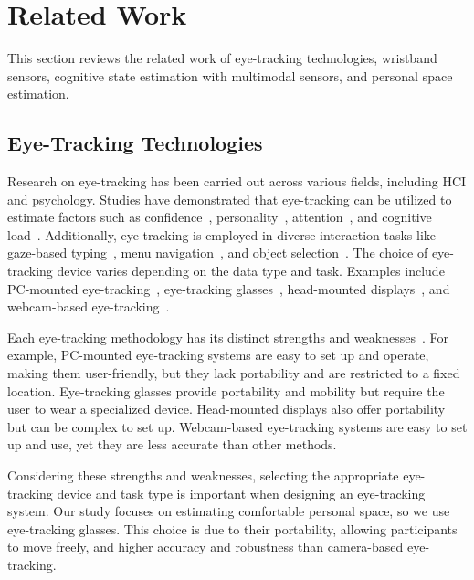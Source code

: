 \section{Related Work}
This section reviews the related work of eye-tracking technologies, wristband sensors, cognitive state estimation with multimodal sensors, and personal space estimation.

\subsection{Eye-Tracking Technologies}
Research on eye-tracking has been carried out across various fields, including HCI and psychology. 
Studies have demonstrated that eye-tracking can be utilized to estimate factors such as confidence~\cite{bhatt2024self}, personality~\cite{berkovsky2019personality}, attention~\cite{vainio2019urban}, and cognitive load~\cite{zagermann2016cognitive}. 
Additionally, eye-tracking is employed in diverse interaction tasks like gaze-based typing~\cite{cai2023speakfaster,lystbaek2022exploring}, menu navigation~\cite{kopacsi2024exploring}, and object selection~\cite{cho2024sonohaptics}.
The choice of eye-tracking device varies depending on the data type and task. 
Examples include PC-mounted eye-tracking~\cite{dembinsky2024eye,dembinsky2024gaze,bhatt2024self}, eye-tracking glasses~\cite{bykowski2018automatic,meteier2023enhancing}, head-mounted displays~\cite{minakata2019pointing}, and webcam-based eye-tracking~\cite{ankur2024appearance,shah2024webcam,shah2024eyedentify}.

Each eye-tracking methodology has its distinct strengths and weaknesses~\cite{carter2020best,shi2024bibliometric}.
For example, PC-mounted eye-tracking systems are easy to set up and operate, making them user-friendly, but they lack portability and are restricted to a fixed location. 
Eye-tracking glasses provide portability and mobility but require the user to wear a specialized device. Head-mounted displays also offer portability but can be complex to set up. 
Webcam-based eye-tracking systems are easy to set up and use, yet they are less accurate than other methods.

Considering these strengths and weaknesses, selecting the appropriate eye-tracking device and task type is important when designing an eye-tracking system.
Our study focuses on estimating comfortable personal space, so we use eye-tracking glasses. 
This choice is due to their portability, allowing participants to move freely, and higher accuracy and robustness than camera-based eye-tracking.

